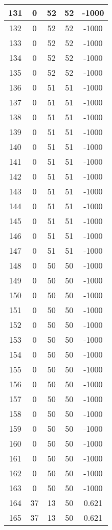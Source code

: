 \documentclass[letterpaper, 12pt]{article}
\begin{document}
\begin{longtable}{|c|c|c|c|c|}
\hline
131 & 0 & 52 & 52 & -1000 \\
\hline
132 & 0 & 52 & 52 & -1000 \\
\hline
133 & 0 & 52 & 52 & -1000 \\
\hline
134 & 0 & 52 & 52 & -1000 \\
\hline
135 & 0 & 52 & 52 & -1000 \\
\hline
136 & 0 & 51 & 51 & -1000 \\
\hline
137 & 0 & 51 & 51 & -1000 \\
\hline
138 & 0 & 51 & 51 & -1000 \\
\hline
139 & 0 & 51 & 51 & -1000 \\
\hline
140 & 0 & 51 & 51 & -1000 \\
\hline
141 & 0 & 51 & 51 & -1000 \\
\hline
142 & 0 & 51 & 51 & -1000 \\
\hline
143 & 0 & 51 & 51 & -1000 \\
\hline
144 & 0 & 51 & 51 & -1000 \\
\hline
145 & 0 & 51 & 51 & -1000 \\
\hline
146 & 0 & 51 & 51 & -1000 \\
\hline
147 & 0 & 51 & 51 & -1000 \\
\hline
148 & 0 & 50 & 50 & -1000 \\
\hline
149 & 0 & 50 & 50 & -1000 \\
\hline
150 & 0 & 50 & 50 & -1000 \\
\hline
151 & 0 & 50 & 50 & -1000 \\
\hline
152 & 0 & 50 & 50 & -1000 \\
\hline
153 & 0 & 50 & 50 & -1000 \\
\hline
154 & 0 & 50 & 50 & -1000 \\
\hline
155 & 0 & 50 & 50 & -1000 \\
\hline
156 & 0 & 50 & 50 & -1000 \\
\hline
157 & 0 & 50 & 50 & -1000 \\
\hline
158 & 0 & 50 & 50 & -1000 \\
\hline
159 & 0 & 50 & 50 & -1000 \\
\hline
160 & 0 & 50 & 50 & -1000 \\
\hline
161 & 0 & 50 & 50 & -1000 \\
\hline
162 & 0 & 50 & 50 & -1000 \\
\hline
163 & 0 & 50 & 50 & -1000 \\
\hline
164 & 37 & 13 & 50 & 0.621 \\
\hline
165 & 37 & 13 & 50 & 0.621 \\

\end{longtable}
\end{document}
